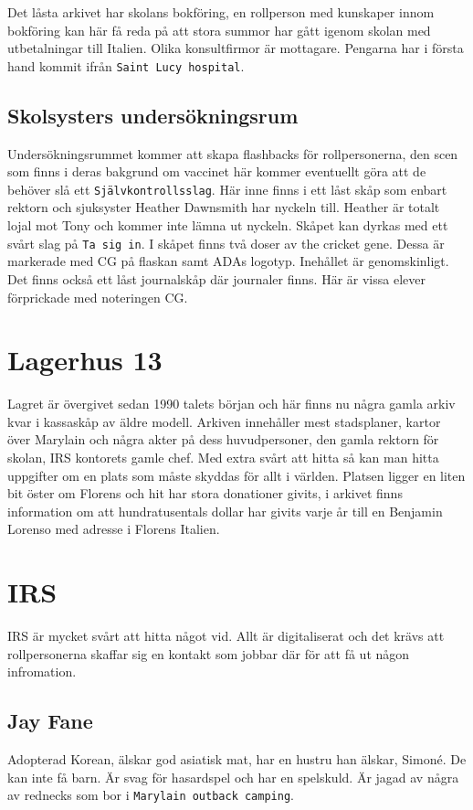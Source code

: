 \documentclass[a5paper,10pt]{report}
\begin{document}
Det låsta arkivet har skolans bokföring, en rollperson med kunskaper innom bokföring kan här få reda på att stora summor har gått igenom skolan med utbetalningar till Italien. Olika konsultfirmor är mottagare. Pengarna har i första hand kommit ifrån \texttt{Saint Lucy hospital}.\\

\subsection{Skolsysters undersökningsrum}
Undersökningsrummet kommer att skapa flashbacks för rollpersonerna, den scen som finns i deras bakgrund om vaccinet här kommer eventuellt göra att de behöver slå ett \texttt{Självkontrollsslag}. Här inne finns i ett låst skåp som enbart rektorn och sjuksyster Heather Dawnsmith har nyckeln till. Heather är totalt lojal mot Tony och kommer inte lämna ut nyckeln. Skåpet kan dyrkas med ett svårt slag på \texttt{Ta sig in}. I skåpet finns två doser av the cricket gene. Dessa är markerade med CG på flaskan samt ADAs logotyp. Inehållet är genomskinligt. Det finns också ett låst journalskåp där journaler finns. Här är vissa elever förprickade med noteringen CG.
\section{Lagerhus 13}
Lagret är övergivet sedan 1990 talets början och här finns nu några gamla arkiv kvar i kassaskåp av äldre modell. Arkiven innehåller mest stadsplaner, kartor över Marylain och några akter på dess huvudpersoner, den gamla rektorn för skolan, IRS kontorets gamle chef. Med extra svårt att hitta så kan man hitta uppgifter om en plats som måste skyddas för allt i världen. Platsen ligger en liten bit öster om Florens och hit har stora donationer givits, i arkivet finns information om att hundratusentals dollar har givits varje år till en Benjamin Lorenso med adresse i Florens Italien.
\section{IRS}
IRS är mycket svårt att hitta något vid. Allt är digitaliserat och det krävs att rollpersonerna skaffar sig en kontakt som jobbar där för att få ut någon infromation.
\subsection{Jay Fane}
Adopterad Korean, älskar god asiatisk mat, har en hustru han älskar, Simoné. De kan inte få barn. Är svag för hasardspel och har en spelskuld. Är jagad av några av rednecks som bor i \texttt{Marylain outback camping}.
\end{document}
